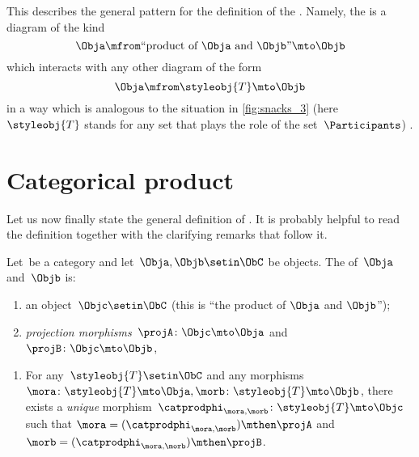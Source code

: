 This describes the general pattern for the definition of the .
Namely, the  is a diagram of the kind
\begin{equation}
    \label{eq:prod-inline-generic-diagram}
    \Obja \mfrom \text{``product of } \Obja \text{ and } \Objb \text{''}  \mto \Objb
\end{equation}
which interacts with any other diagram of the form
\begin{equation}
    \label{eq:prod-inline-test-diagram}
    \Obja \mfrom \styleobj{T} \mto \Objb
\end{equation}
in a way which is analogous to the situation in \cref{fig:snacks_3} (here~$\styleobj{T}$ stands for any set that plays the role of the set~$\Participants$) .

\section{Categorical product}

Let us now finally state the general definition of .
It is probably helpful to read the definition together with the clarifying remarks that follow it.

\begin{ctdefinition}
    \label{def:categorical-product}
    Let~\CatC be a category and let~$\Obja, \Objb \setin \ObC$ be objects.
    The  of~$\Obja$ and~$\Objb$ is: \\
    \constit
    \begin{enumerate}
        \item an object~$\Objc \setin \ObC$ (this is ``the product of $\Obja$  and $\Objb$'');
        \item \emph{projection morphisms}~$\projA \colon \Objc \mto \Obja$ and~$\projB \colon \Objc \mto \Objb$,
    \end{enumerate}
    \condit
    \begin{enumerate}
        \item For any~$\styleobj{T} \setin \ObC$ and any morphisms~$\mora \colon \styleobj{T} \mto \Obja, \morb \colon \styleobj{T} \mto \Objb$, there exists a \emph{unique} morphism~$\catprodphi_{\mora,\morb} \colon \styleobj{T} \mto \Objc$ such that $\mora = (\catprodphi_{\mora,
                      \morb})\mthen \projA$ and $\morb=(\catprodphi_{\mora, \morb})\mthen \projB$.
    \end{enumerate}
\end{ctdefinition}

